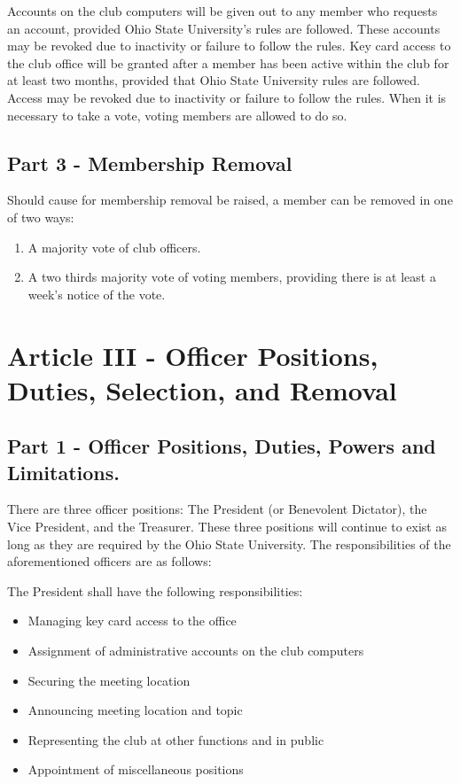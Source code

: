 \documentclass{article}
\begin{document}
	Accounts on the club computers will be given out to any member who requests an account, provided Ohio State University's rules are followed.  These accounts may be revoked due to inactivity or failure to follow the rules.  Key card access to the club office will be granted after a member has been active within the club for at least two months, provided that Ohio State University rules are followed.  Access may be revoked due to inactivity or failure to follow the rules.
	When it is necessary to take a vote, voting members are allowed to do so.

	\subsection{Part 3 - Membership Removal}

	Should cause for membership removal be raised, a member can be removed in one of two ways:
	\begin{enumerate}
		\item A majority vote of club officers.
		\item A two thirds majority vote of voting members, providing there is at least a week's notice of the vote.
	\end{enumerate}

	\section{Article III - Officer Positions, Duties, Selection, and Removal}

	\subsection{Part 1 - Officer Positions, Duties, Powers and Limitations.}

	There are three officer positions: The President (or Benevolent Dictator), the Vice President, and the Treasurer.  These three positions will continue to exist as long as they are required by the Ohio State University.  The responsibilities of the aforementioned officers are as follows:

	The President shall have the following responsibilities:

	\begin{itemize}
		\item Managing key card access to the office
		\item Assignment of administrative accounts on the club computers
		\item Securing the meeting location
		\item Announcing meeting location and topic
		\item Representing the club at other functions and in public
		\item Appointment of miscellaneous positions
	\end{itemize}
\end{document}
